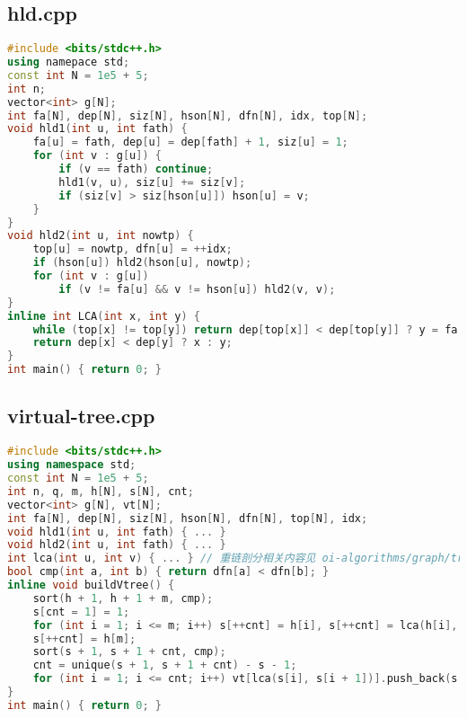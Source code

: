 \documentclass[9pt, a4paper, oneside]{book}
\begin{document}
\subsection{hld.cpp}
\begin{lstlisting}[language={C++}]
#include <bits/stdc++.h>
using namepace std;
const int N = 1e5 + 5;
int n;
vector<int> g[N];
int fa[N], dep[N], siz[N], hson[N], dfn[N], idx, top[N];
void hld1(int u, int fath) {
    fa[u] = fath, dep[u] = dep[fath] + 1, siz[u] = 1;
    for (int v : g[u]) {
        if (v == fath) continue;
        hld1(v, u), siz[u] += siz[v];
        if (siz[v] > siz[hson[u]]) hson[u] = v;
    }
}
void hld2(int u, int nowtp) {
    top[u] = nowtp, dfn[u] = ++idx;
    if (hson[u]) hld2(hson[u], nowtp);
    for (int v : g[u])
        if (v != fa[u] && v != hson[u]) hld2(v, v);
}
inline int LCA(int x, int y) {
    while (top[x] != top[y]) return dep[top[x]] < dep[top[y]] ? y = fa[top[y]] : x = fa[top[x]];
    return dep[x] < dep[y] ? x : y;
}
int main() { return 0; }\end{lstlisting}
\subsection{virtual-tree.cpp}
\begin{lstlisting}[language={C++}]
#include <bits/stdc++.h>
using namespace std;
const int N = 1e5 + 5;
int n, q, m, h[N], s[N], cnt;
vector<int> g[N], vt[N];
int fa[N], dep[N], siz[N], hson[N], dfn[N], top[N], idx;
void hld1(int u, int fath) { ... }
void hld2(int u, int fath) { ... }
int lca(int u, int v) { ... } // 重链剖分相关内容见 oi-algorithms/graph/tree/hld.cpp
bool cmp(int a, int b) { return dfn[a] < dfn[b]; }
inline void buildVtree() {
    sort(h + 1, h + 1 + m, cmp);
    s[cnt = 1] = 1;
    for (int i = 1; i <= m; i++) s[++cnt] = h[i], s[++cnt] = lca(h[i], h[i + 1]);
    s[++cnt] = h[m];
    sort(s + 1, s + 1 + cnt, cmp);
    cnt = unique(s + 1, s + 1 + cnt) - s - 1;
    for (int i = 1; i <= cnt; i++) vt[lca(s[i], s[i + 1])].push_back(s[i + 1]);
}
int main() { return 0; }\end{lstlisting}
\end{document}

